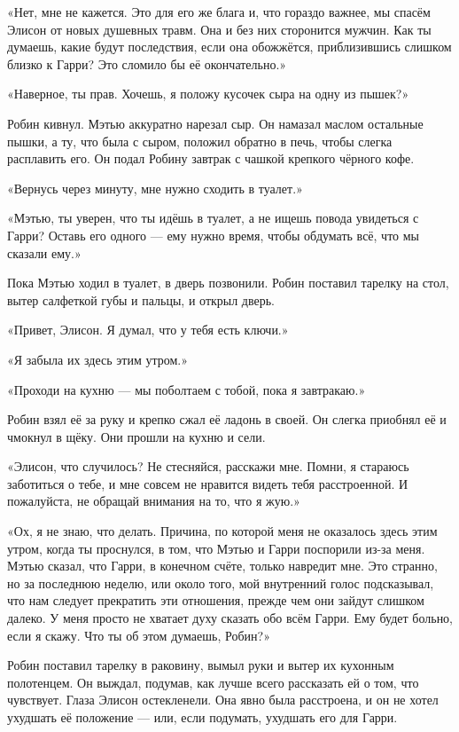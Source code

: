 \documentclass[a5paper, 9pt,
final, openany, twoside=true]{memoir}
\begin{document}
«Нет, мне не кажется. Это для его же блага и, что гораздо важнее, мы спасём Элисон от новых душевных травм. Она и без них сторонится мужчин. Как ты думаешь, какие будут последствия, если она обожжётся, приблизившись слишком близко к Гарри? Это сломило бы её окончательно.»

«Наверное, ты прав. Хочешь, я положу кусочек сыра на одну из пышек?»

Робин кивнул. Мэтью аккуратно нарезал сыр. Он намазал маслом остальные пышки, а ту, что была с сыром, положил обратно в печь, чтобы слегка расплавить его. Он подал Робину завтрак с чашкой крепкого чёрного кофе.

«Вернусь через минуту, мне нужно сходить в туалет.»

«Мэтью, ты уверен, что ты идёшь в туалет, а не ищешь повода увидеться с Гарри? Оставь его одного — ему нужно время, чтобы обдумать всё, что мы сказали ему.»

Пока Мэтью ходил в туалет, в дверь позвонили. Робин поставил тарелку на стол, вытер салфеткой губы и пальцы, и открыл дверь.

«Привет, Элисон. Я думал, что у тебя есть ключи.»

«Я забыла их здесь этим утром.»

«Проходи на кухню — мы поболтаем с тобой, пока я завтракаю.»

Робин взял её за руку и крепко сжал её ладонь в своей. Он слегка приобнял её и чмокнул в щёку. Они прошли на кухню и сели.

«Элисон, что случилось? Не стесняйся, расскажи мне. Помни, я стараюсь заботиться о тебе, и мне совсем не нравится видеть тебя расстроенной. И пожалуйста, не обращай внимания на то, что я жую.»

«Ох, я не знаю, что делать. Причина, по которой меня не оказалось здесь этим утром, когда ты проснулся, в том, что Мэтью и Гарри поспорили из-за меня. Мэтью сказал, что Гарри, в конечном счёте, только навредит мне. Это странно, но за последнюю неделю, или около того, мой внутренний голос подсказывал, что нам следует прекратить эти отношения, прежде чем они зайдут слишком далеко. У меня просто не хватает духу сказать обо всём Гарри. Ему будет больно, если я скажу. Что ты об этом думаешь, Робин?»

Робин поставил тарелку в раковину, вымыл руки и вытер их кухонным полотенцем. Он выждал, подумав, как лучше всего рассказать ей о том, что чувствует. Глаза Элисон остекленели. Она явно была расстроена, и он не хотел ухудшать её положение — или, если подумать, ухудшать его для Гарри.
\end{document}
